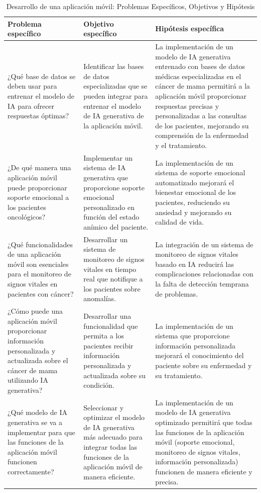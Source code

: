 \begin{table}[htbp]
\centering
\small
\begin{tabular}{|p{5cm}|p{5cm}|p{5cm}|}
\hline
\textbf{Problema específico} & \textbf{Objetivo específico} & \textbf{Hipótesis específica} \\
\hline
¿Qué base de datos se deben usar para entrenar el modelo de IA para ofrecer respuestas óptimas? 
& Identificar las bases de datos especializadas que se pueden integrar para entrenar el modelo de IA generativa de la aplicación móvil. 
& La implementación de un modelo de IA generativa entrenado con bases de datos médicas especializadas en el cáncer de mama permitirá a la aplicación móvil proporcionar respuestas precisas y personalizadas a las consultas de los pacientes, mejorando su comprensión de la enfermedad y el tratamiento. \\
\hline
¿De qué manera una aplicación móvil puede proporcionar soporte emocional a los pacientes oncológicos? 
& Implementar un sistema de IA generativa que proporcione soporte emocional personalizado en función del estado anímico del paciente. 
& La implementación de un sistema de soporte emocional automatizado mejorará el bienestar emocional de los pacientes, reduciendo su ansiedad y mejorando su calidad de vida. \\
\hline
¿Qué funcionalidades de una aplicación móvil son esenciales para el monitoreo de signos vitales en pacientes con cáncer? 
& Desarrollar un sistema de monitoreo de signos vitales en tiempo real que notifique a los pacientes sobre anomalías. 
& La integración de un sistema de monitoreo de signos vitales basado en IA reducirá las complicaciones relacionadas con la falta de detección temprana de problemas. \\
\hline
¿Cómo puede una aplicación móvil proporcionar información personalizada y actualizada sobre el cáncer de mama utilizando IA generativa? 
& Desarrollar una funcionalidad que permita a los pacientes recibir información personalizada y actualizada sobre su condición. 
& La implementación de un sistema que proporcione información personalizada mejorará el conocimiento del paciente sobre su enfermedad y su tratamiento. \\
\hline
¿Qué modelo de IA generativa se va a implementar para que las funciones de la aplicación móvil funcionen correctamente? 
& Seleccionar y optimizar el modelo de IA generativa más adecuado para integrar todas las funciones de la aplicación móvil de manera eficiente. 
& La implementación de un modelo de IA generativa optimizado permitirá que todas las funciones de la aplicación móvil (soporte emocional, monitoreo de signos vitales, información personalizada) funcionen de manera eficiente y precisa. \\
\hline
\end{tabular}
\caption{Desarrollo de una aplicación móvil: Problemas Específicos, Objetivos y Hipótesis}
\label{tabla_especificos}
\end{table}

